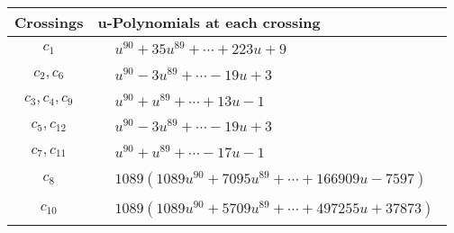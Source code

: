 \documentclass[1p]{elsarticle_modified}
\theoremstyle{definition}
\begin{document}
\begin{tabular}{m{50pt}|m{274pt}}
Crossings & \hspace{64pt}u-Polynomials at each crossing \\
\hline $$\begin{aligned}c_{1}\end{aligned}$$&$\begin{aligned}
&u^{90}+35 u^{89}+\cdots+223 u+9
\end{aligned}$\\
\hline $$\begin{aligned}c_{2},c_{6}\end{aligned}$$&$\begin{aligned}
&u^{90}-3 u^{89}+\cdots-19 u+3
\end{aligned}$\\
\hline $$\begin{aligned}c_{3},c_{4},c_{9}\end{aligned}$$&$\begin{aligned}
&u^{90}+u^{89}+\cdots+13 u-1
\end{aligned}$\\
\hline $$\begin{aligned}c_{5},c_{12}\end{aligned}$$&$\begin{aligned}
&u^{90}-3 u^{89}+\cdots-19 u+3
\end{aligned}$\\
\hline $$\begin{aligned}c_{7},c_{11}\end{aligned}$$&$\begin{aligned}
&u^{90}+u^{89}+\cdots-17 u-1
\end{aligned}$\\
\hline $$\begin{aligned}c_{8}\end{aligned}$$&$\begin{aligned}
&1089(1089 u^{90}+7095 u^{89}+\cdots+166909 u-7597)
\end{aligned}$\\
\hline $$\begin{aligned}c_{10}\end{aligned}$$&$\begin{aligned}
&1089(1089 u^{90}+5709 u^{89}+\cdots+497255 u+37873)
\end{aligned}$\\
\hline
\end{tabular}\\~\\
\end{document}
